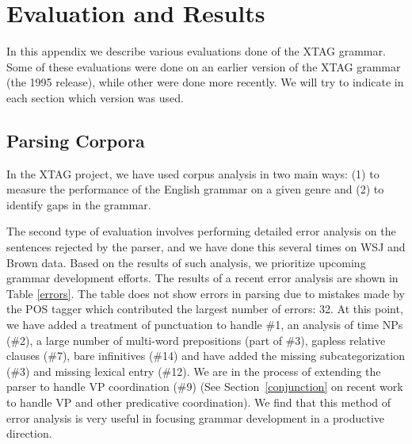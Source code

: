 \chapter{Evaluation and Results} 
\label{evaluation} 
 
In this appendix we describe various evaluations done of the XTAG 
grammar. Some of these evaluations were done on an earlier version of 
the XTAG grammar (the 1995 release), while other were done more 
recently. We will try to indicate in each section which version was 
used. 
 
\section{Parsing Corpora} 
 
In the XTAG project, we have used corpus analysis in two main ways: 
(1) to measure the performance of the English grammar on a given genre 
and (2) to identify gaps in the grammar. 
 
The second type of evaluation involves performing detailed error 
analysis on the sentences rejected by the parser, and we have done 
this several times on WSJ and Brown data. 
Based on the results of such analysis, we prioritize upcoming grammar 
development efforts. The results of a recent error analysis are shown 
in Table \ref{errors}.  The table does not show errors in parsing due 
to mistakes made by the POS tagger which contributed the largest 
number of errors: 32. At this point, we have added a treatment of 
punctuation to handle \#1, an analysis of time NPs (\#2), a large 
number of multi-word prepositions (part of \#3), gapless relative 
clauses (\#7), bare infinitives (\#14) and have added the missing 
subcategorization (\#3) and missing lexical entry (\#12).  We are in 
the process of extending the parser to handle VP coordination (\#9) 
(See Section~\ref{conjunction} on recent work to handle VP and other 
predicative coordination). We find that this method of error analysis 
is very useful in focusing grammar development in a productive 
direction. 
 
